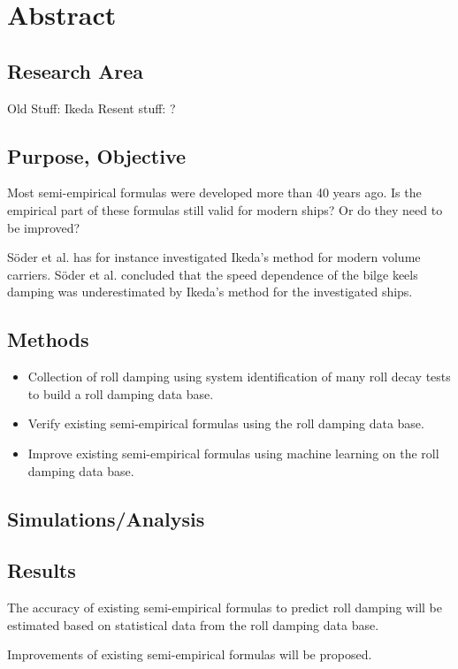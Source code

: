 \section{Abstract}
\label{se:abstract}
\subsection{Research Area}
Old Stuff: Ikeda
Resent stuff: ?
		
\subsection{Purpose, Objective}
Most semi-empirical formulas were developed more than 40 years ago. Is the empirical part of these formulas still valid for modern ships? Or do they need to be improved? 

Söder et al. \cite{soder_ikeda_2019} has for instance investigated Ikeda’s method for modern volume carriers. Söder et al. \cite{soder_ikeda_2019} concluded that the speed dependence of the bilge keels damping was underestimated by Ikeda’s method for the investigated ships.  

\subsection{Methods}
\begin{itemize}
    \item Collection of roll damping using system identification of many roll decay tests to build a roll damping data base.
    \item Verify existing semi-empirical formulas using the roll damping data base. 
    \item Improve existing semi-empirical formulas using machine learning on the roll damping data base.  
\end{itemize}		
			
			
\subsection{Simulations/Analysis}
 
			
\subsection{Results}
The accuracy of existing semi-empirical formulas to predict roll damping will be estimated based on statistical data from the roll damping data base.

Improvements of existing semi-empirical formulas will be proposed.